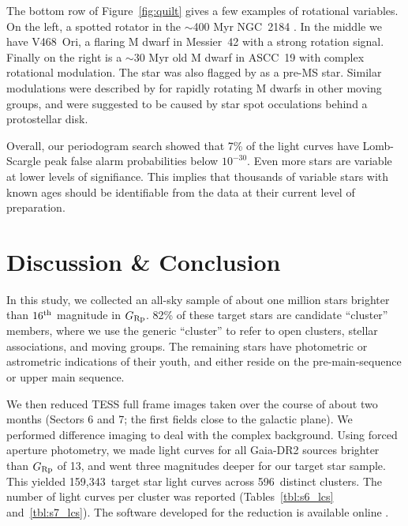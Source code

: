 \documentclass[12pt,twocolumn,tighten]{aastex62}
\newcommand{\numberlcs}{159{,}343\ } %
\newcommand{\numberclusters}{596\ } %
\begin{document}
The bottom row of Figure~\ref{fig:quilt} gives a few examples of
rotational variables.  On the left, a spotted rotator in the
$\sim$400 Myr NGC~2184 \citep{cantat-gaudin_gaia_2018}.  In the
middle we have V468~Ori, a flaring M dwarf in Messier~42 with a strong
rotation signal.
Finally on the right is a $\sim$30 Myr old M dwarf in ASCC~19
with complex rotational modulation.
The star was also flagged by \citet{zari_3d_2018} as a pre-MS star.
Similar modulations were described by \citet{zhan_complex_2019} for
rapidly rotating M dwarfs in other moving groups, and were suggested
to be caused by star spot occulations behind a protostellar disk.

Overall, our periodogram search showed that 7\% of the light curves
have Lomb-Scargle peak false alarm probabilities below $10^{-30}$.
Even more stars are variable at lower levels of signifiance.  This implies
that thousands of variable stars with known ages should
be identifiable from the data at their current level of preparation.




\section{Discussion \& Conclusion}
\label{sec:conclusion}

In this study, we collected an all-sky sample of about one million
stars brighter than $16^{\rm th}$ magnitude in $G_{\rm Rp}$.  82\% of
these target stars are candidate ``cluster'' members, where we use the
generic ``cluster'' to refer to open clusters, stellar associations,
and moving groups.  The remaining stars have photometric or
astrometric indications of their youth, and either reside on the
pre-main-sequence or upper main sequence.

We then reduced TESS full frame images taken over the course of about
two months (Sectors 6 and 7; the first fields close to the galactic
plane).  We performed difference imaging to deal with the complex
background.  Using forced aperture photometry, we made light curves
for all Gaia-DR2 sources brighter than $G_{\rm Rp}$ of 13, and went
three magnitudes deeper for our target star sample.  This yielded
\numberlcs target star light curves across \numberclusters distinct
clusters.  The number of light curves per cluster was reported
(Tables~\ref{tbl:s6_lcs} and~\ref{tbl:s7_lcs}).  The software
developed for the reduction is available online
\citep{bhatti_cdips-pipeline_2019}.
\end{document}
